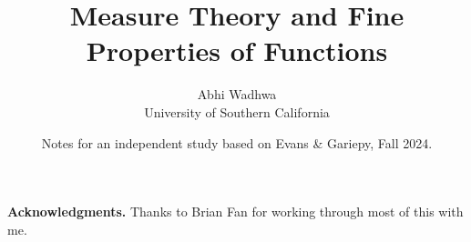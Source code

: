 \documentclass[11pt]{article}
\title{\textbf{Measure Theory and Fine Properties of Functions}}
\author{Abhi Wadhwa\\ \small University of Southern California}
\date{Notes for an independent study based on Evans \& Gariepy, Fall 2024.}
\theoremstyle{definition}
\theoremstyle{remark}
\begin{document}
\maketitle
\thispagestyle{empty}
\newpage

\tableofcontents
\newpage








\bigskip
\noindent\textbf{Acknowledgments.}
Thanks to Brian Fan for working through most of this with me.
\end{document}
